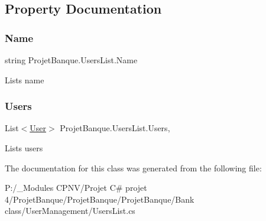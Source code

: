 \subsection{Property Documentation}
\mbox{\label{class_projet_banque_1_1_users_list_a563f87594db97ece776aa3c229af316a}} 
\subsubsection{\texorpdfstring{Name}{Name}}
{\footnotesize\ttfamily string Projet\+Banque.\+Users\+List.\+Name\hspace{0.3cm}{\ttfamily [get]}}



List\textquotesingle{}s name 

\mbox{\label{class_projet_banque_1_1_users_list_aa31d44788c6aefd240ab776aeab7f18b}} 
\subsubsection{\texorpdfstring{Users}{Users}}
{\footnotesize\ttfamily List$<$\mbox{\hyperlink{class_projet_banque_1_1_user}{User}}$>$ Projet\+Banque.\+Users\+List.\+Users\hspace{0.3cm}{\ttfamily [get]}, {\ttfamily [set]}}



List\textquotesingle{}s users 



The documentation for this class was generated from the following file\+:\begin{DoxyCompactItemize}
\item 
P\+:/\+\_\+\+Modules C\+P\+N\+V/\+Projet C\# projet 4/\+Projet\+Banque/\+Projet\+Banque/\+Projet\+Banque/\+Bank class/\+User\+Management/Users\+List.\+cs\end{DoxyCompactItemize}
